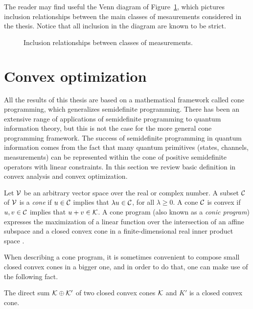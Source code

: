 The reader may find useful the Venn diagram of Figure~\ref{fig:classes-measurements}, 
which pictures inclusion relationships between the main classes of mesaurements
considered in the thesis. Notice that all inclusion in the diagram are known
to be strict.

\begin{figure}[!ht]
  \centering
    \def\svgwidth{200pt}
    \scalebox{.75}{
    }
    \caption{Inclusion relationships between classes of measurements.}
    \label{fig:classes-measurements}
\end{figure}

\section{Convex optimization}
\label{sec:convex-optimization}

All the results of this thesis are based on a mathematical framework 
called cone programming, which generalizes semidefinite programming.
There has been an extensive range of applications of semidefinite programming
to quantum information theory, but this is not the case for  
the more general cone programming framework. 
The success of semidefinite programming in quantum information comes from the fact 
that many quantum primitives (states, channels, measurements) 
can be represented within the cone of positive semidefinite operators with linear
constraints. 
In this section we review basic definition in convex analysis and convex optimization.

Let $\mathcal{V}$ be an arbitrary vector space over the real or complex number.
A subset $\mathcal{C}$ of $\mathcal{V}$ is a \emph{cone} if $u\in\mathcal{C}$ implies that $\lambda u \in \mathcal{C}$,
for all $\lambda \geq 0$. A cone $\mathcal{C}$ is convex if $u,v\in\mathcal{C}$ implies that
$u + v \in \mathcal{K}$.
A cone program (also known as a \emph{conic program}) expresses the
maximization of a linear function over the intersection of an affine subspace
and a closed convex cone in a finite-dimensional real inner product
space \cite{Boyd04}. 

When describing a cone program, it is sometimes convenient to compose small closed convex 
cones in a bigger one, and in order to do that, one can make use of the following fact. 
\begin{fact}
\label{fact:direct-sum-closed}
The direct sum $\mathcal{K} \oplus \mathcal{K}'$ of two closed convex cones $\mathcal{K}$ and $K'$ is a 
closed convex cone. 
\end{fact}

